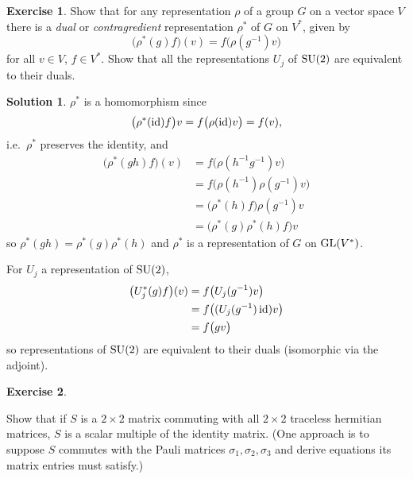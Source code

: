 \documentclass[11pt, a4paper]{report}
\theoremstyle{definition}
\newtheorem{exercise}{Exercise}[part]
\newtheorem{solution}{Solution}[part]
\newenvironment{ex}{\begin{exercise}}{\end{exercise}\pagebreak[1]}
\newenvironment{sol}{\begin{solution}}{\end{solution}\pagebreak[3]}
\newcommand*{\GL}{\ensuremath\text{GL}}
\newcommand*{\SU}{\ensuremath\text{SU}}
\newcommand*{\id}{\ensuremath\mathop{}\mathopen{}\mathrm{id}}
\begin{document}
\begin{ex}

Show that for any representation $\rho$ of a group $G$ on a vector space $V$ there is a \emph{dual} or \emph{contragredient} representation $\rho^*$ of $G$ on $V^*$, given by
\[
    \bigl( \rho^*(g) f \bigr) (v) = f \bigl( \rho(g^{-1}) v \bigr)
\]
for all $v \in V$, $f \in V^*$.
Show that all the representations $U_j$ of $\SU(2)$ are equivalent to their duals.

\end{ex}

\begin{sol}

$\rho^*$ is a homomorphism since
\[
    \bigl( \rho^*(\id) f \bigr) v = f \bigl(\rho(\id) v \bigr) = f(v),
\]
i.e.\ $\rho^*$ preserves the identity, and
\begin{align*}
    \bigl( \rho^*(gh) f \bigr) (v) &= f \bigl( \rho(h^{-1} g^{-1}) v \bigr) \\
        &= f \bigl( \rho(h^{-1}) \rho(g^{-1}) v \bigr) \\
        &= \bigl( \rho^*(h) f \bigr) \rho(g^{-1}) v \\
        &= \bigl( \rho^*(g) \rho^*(h) f \bigr) v
\end{align*}
so $\rho^*(gh) = \rho^*(g) \rho^*(h)$ and $\rho^*$ is a representation of $G$ on $\GL(V^*)$.

For $U_j$ a representation of $\SU(2)$,
\begin{align*}
    \bigl( U_j^*(g) f \bigr) (v) &= f \bigl( U_j(g^{-1}) v \bigr) \\
                                 &= f \bigl( (U_j(g^{-1}) \id) v \bigr) \\
                                 &= f \bigl( g v \bigr)
\end{align*}
so representations of $\SU(2)$ are equivalent to their duals (isomorphic via the adjoint).

\end{sol}

\begin{ex}\label{ex:commutativescalarmultipleidentity}

Show that if $S$ is a $2 \times 2$ matrix commuting with all $2 \times 2$ traceless hermitian matrices, $S$ is a scalar multiple of the identity matrix.
(One approach is to suppose $S$ commutes with the Pauli matrices $\sigma_1, \sigma_2, \sigma_3$ and derive equations its matrix entries must satisfy.)

\end{ex}
\end{document}
